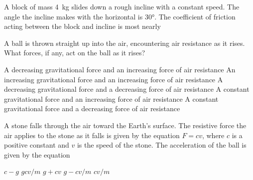 \documentclass{../../../oss-classkick-exam}
\begin{document}
\begin{multicols*}{2}
\begin{questions}
    \question A block of mass \SI{4}{\kilo\gram} slides down a rough incline
    with a constant speed. The angle the incline makes with the horizontal is
    \ang{30}. The coefficient of friction acting between the block and incline
    is most nearly
    \begin{center}
    \end{center}
    \begin{choices}
    \end{choices}

    \question A ball is thrown straight up into the air, encountering air
    resistance as it rises. What forces, if any, act on the ball as it rises?
    \begin{choices}
      \choice A decreasing gravitational force and an increasing force of air
      resistance
      \choice An increasing gravitational force and an increasing force of air
      resistance
      \choice A decreasing gravitational force and a decreasing force of air
      resistance
      \choice A constant gravitational force and an increasing force of air
      resistance
      \choice A constant gravitational force and a decreasing force of air
      resistance
    \end{choices}
    \vspace{.7in}

    \question A stone falls through the air toward the Earth's surface. The
    resistive force the air applies to the stone as it falls is given by the
    equation $F=cv$, where $c$ is a positive constant and $v$ is the speed of
    the stone. The acceleration of the ball is given by the equation
    \begin{choices}
      \choice $c-g$
      \choice $gcv/m$
      \choice $g+cv$
      \choice $g-cv/m$
      \choice $cv/m$
    \end{choices}


\end{questions}
\end{multicols*}
\end{document}
